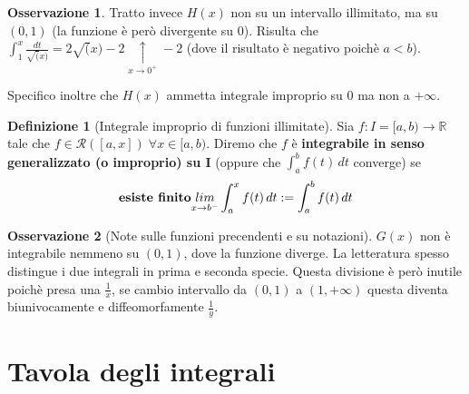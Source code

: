 \documentclass{article}
\theoremstyle{definition}
\theoremstyle{definition}
\theoremstyle{definition}
\newtheorem{definition}{Definizione}[section]
\theoremstyle{definition}
\newtheorem{remark}{Osservazione}[section]
\theoremstyle{definition}
\theoremstyle{definition}
\begin{document}
\begin{remark}
    Tratto invece $H(x)$ non su un intervallo illimitato, ma su $(0,1)$ (la funzione è però divergente su 0). Risulta che $\displaystyle{\int_1^x\frac{dt}{\sqrt(x)}=2\sqrt(x)-2 \underset{x\rightarrow 0^+}{\uparrow}-2}$ (dove il risultato è negativo poichè $a<b$).

    Specifico inoltre che $H(x)$ ammetta integrale improprio su 0 ma non a $+\infty$.
\end{remark}

\begin{definition}[Integrale improprio di funzioni illimitate]
    Sia $f:I=[a,b)\rightarrow\mathbb{R}$ tale che $f\in\mathcal{R}([a,x])\;\forall x\in[a,b)$. Diremo che $f$ è \textbf{integrabile in senso generalizzato (o improprio) su I} (oppure che $\int_a^b f(t)\,dt$ converge) se 
    \[\text{\textbf{esiste finito}} \underset{x\rightarrow b^-}{lim}\int_a^x f(t)\,dt:=\int_a^b f(t)\,dt\]
\end{definition}

\begin{remark}[Note sulle funzioni precendenti e su notazioni]
    $G(x)$ non è integrabile nemmeno su $(0,1)$, dove la funzione diverge. La letteratura spesso distingue i due integrali in prima e seconda specie. Questa divisione è però inutile poichè presa una $\frac{1}{x}$, se cambio intervallo da $(0,1)$ a $(1,+\infty)$ questa diventa biunivocamente e diffeomorfamente $\frac{1}{y}$.
\end{remark}





\newpage
\section{Tavola degli integrali}
\end{document}
